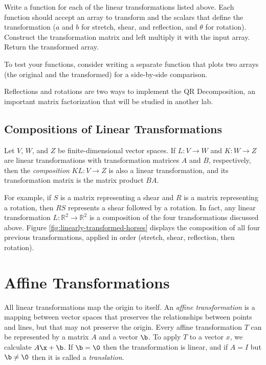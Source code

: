 \begin{problem} %
Write a function for each of the linear transformations listed above.
Each function should accept an array to transform and the scalars that define the transformation ($a$ and $b$ for stretch, shear, and reflection, and $\theta$ for rotation).
Construct the transformation matrix and left multiply it with the input array.
Return the transformed array.

To test your functions, consider writing a separate function that plots two arrays (the original and the transformed) for a side-by-side comparison.
\label{prob:implement-linear-transformations}
\end{problem}

\begin{info} %
Reflections and rotations are two ways to implement the QR Decomposition, an important matrix factorization that will be studied in another lab.
\end{info}

\subsection*{Compositions of Linear Transformations} %

Let $V$, $W$, and $Z$ be finite-dimensional vector spaces.
If $L:V\rightarrow W$ and $K:W\rightarrow Z$ are linear transformations with transformation matrices $A$ and $B$, respectively, then the \emph{composition} $KL:V\rightarrow Z$ is also a linear transformation, and its transformation matrix is the matrix product $BA$.

For example, if $S$ is a matrix representing a shear and $R$ is a matrix representing a rotation, then $RS$ represents a shear followed by a rotation.
In fact, any linear transformation $L:\mathbb{R}^2 \rightarrow\mathbb{R}^2$ is a composition of the four transformations discussed above.
Figure \ref{fig:linearly-transformed-horses} displays the composition of all four previous transformations, applied in order (stretch, shear, reflection, then rotation).

\section*{Affine Transformations} %

All linear transformations map the origin to itself.
An \emph{affine transformation} is a mapping between vector spaces that preserves the relationships between points and lines, but that may not preserve the origin.
Every affine transformation $T$ can be represented by a matrix $A$ and a vector $\b$.
To apply $T$ to a vector $x$, we calculate $A\x + \b$.
If $\b = \0$ then the transformation is linear, and if $A = I$ but $\b\neq\0$ then it is called a \emph{translation}.

